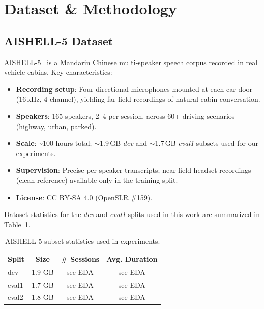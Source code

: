
\section{Dataset \& Methodology}
\label{sec:methodology}

\subsection{AISHELL-5 Dataset}
\label{subsec:dataset}

AISHELL-5~\cite{aishell5_2025} is a Mandarin Chinese multi-speaker speech
corpus recorded in real vehicle cabins. Key characteristics:

\begin{itemize}
    \item \textbf{Recording setup}: Four directional microphones mounted at
    each car door (16\,kHz, 4-channel), yielding far-field recordings of
    natural cabin conversation.
    \item \textbf{Speakers}: 165 speakers, 2–4 per session, across 60+
    driving scenarios (highway, urban, parked).
    \item \textbf{Scale}: \textasciitilde100 hours total;
    $\sim$1.9\,GB \textit{dev} and $\sim$1.7\,GB \textit{eval1} subsets
    used for our experiments.
    \item \textbf{Supervision}: Precise per-speaker transcripts; near-field
    headset recordings (clean reference) available only in the training split.
    \item \textbf{License}: CC BY-SA 4.0 (OpenSLR \#159).
\end{itemize}

Dataset statistics for the \textit{dev} and \textit{eval1} splits used in
this work are summarized in Table~\ref{tab:dataset}.

\begin{table}[h]
\centering
\caption{AISHELL-5 subset statistics used in experiments.}
\label{tab:dataset}
\begin{tabular}{lccc}
\toprule
\textbf{Split} & \textbf{Size} & \textbf{\# Sessions} & \textbf{Avg. Duration}\\
\midrule
dev   & 1.9 GB & see EDA & see EDA \\
eval1 & 1.7 GB & see EDA & see EDA \\
eval2 & 1.8 GB & see EDA & see EDA \\
\bottomrule
\end{tabular}
\end{table}

